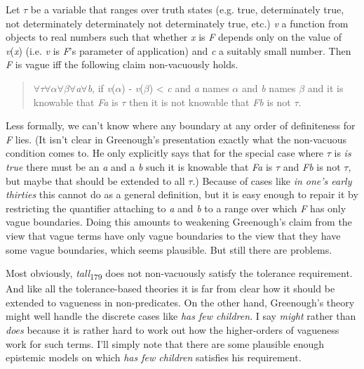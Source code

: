 Let ${\tau}$ be a variable that ranges over truth states (e.g. true, determinately true, not determinately determinately not determinately true, etc.) \textit{v} a function from objects to real numbers such that whether \textit{x} is \textit{F} depends only on the value of \textit{v}(\textit{x}) (i.e. \textit{v} is \textit{F}'s parameter of application) and \textit{c} a suitably small number. Then \textit{F} is vague iff the following claim non-vacuously holds.

\begin{quote}
${\forall}{\tau}{\forall}{\alpha}{\forall}{\beta}{\forall}$\textit{a}${\forall}$\textit{b}, if {\textbar}\textit{v}(${\alpha}$) - \textit{v}(${\beta}$){\textbar} {\textless} \textit{c} and \textit{a} names ${\alpha}$ and \textit{b} names ${\beta}$ and it is knowable that \textit{Fa} is ${\tau}$ then it is not knowable that \textit{Fb} is not ${\tau}$.
\end{quote}

\noindent Less formally, we can't know where any boundary at any order of definiteness for \textit{F} lies. (It isn't clear in Greenough's presentation exactly what the non-vacuous condition comes to. He only explicitly says that for the special case where ${\tau}$ is \textit{is true} there must be an \textit{a} and a \textit{b} such it is knowable that \textit{Fa} is ${\tau}$ and \textit{Fb} is not ${\tau}$, but maybe that should be extended to all ${\tau}$.) Because of cases like \textit{in one's early thirties} this cannot do as a general definition, but it is easy enough to repair it by restricting the quantifier attaching to \textit{a} and \textit{b} to a range over which \textit{F} has only vague boundaries. Doing this amounts to weakening Greenough's claim from the view that vague terms have only vague boundaries to the view that they have some vague boundaries, which seems plausible. But still there are problems.

Most obviously, \textit{tall}\textsubscript{179} does not non-vacuously satisfy the tolerance requirement. And like all the tolerance-based theories it is far from clear how it should be extended to vagueness in non-predicates. On the other hand, Greenough's theory might well handle the discrete cases like \textit{has few children}. I say \textit{might} rather than \textit{does} because it is rather hard to work out how the higher-orders of vagueness work for such terms. I'll simply note that there are some plausible enough epistemic models on which \textit{has few children} satisfies his requirement.

